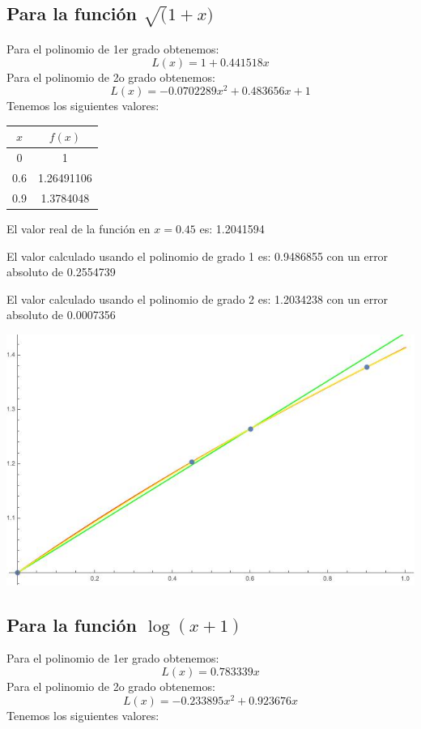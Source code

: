 \documentclass{article}
\begin{document}
\subsection{Para la función $\sqrt(1+x)$}
Para el polinomio de 1er grado obtenemos: 
$$L(x)=1 +0.441518 x $$
Para el polinomio de 2o grado obtenemos: 
$$L(x)=-0.0702289 x^2+0.483656 x+1$$
Tenemos los siguientes valores:

\begin{center}
    \begin{tabular}{||c c||} 
    \hline
    $x$ & $f(x)$ \\ [0.5ex] 
    \hline
    0 & 1  \\ 
    \hline
    0.6 & 1.26491106 \\
    \hline
    0.9 & 1.3784048 \\
    \hline
   \end{tabular}
\end{center}

El valor real de la función en $x=0.45$ es: 1.2041594

El valor calculado usando el polinomio de grado 1 es: 0.9486855 con un error absoluto de 0.2554739

El valor calculado usando el polinomio de grado 2 es: 1.2034238 con un error absoluto de 0.0007356

\includegraphics[scale=0.5]{Grafica2.jpeg}


\subsection{Para la función $\log(x+1)$}
Para el polinomio de 1er grado obtenemos: 
$$L(x)=0.783339 x$$
Para el polinomio de 2o grado obtenemos: 
$$L(x)=-0.233895 x^2+0.923676 x$$
Tenemos los siguientes valores:
\end{document}
